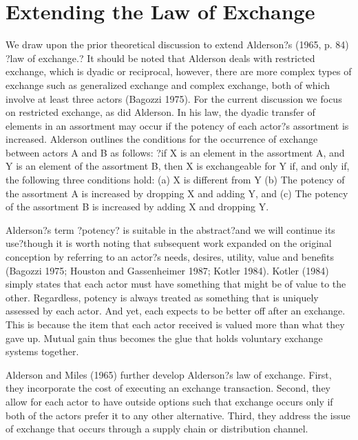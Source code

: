 \section{Extending the Law of Exchange}
We draw upon the prior theoretical discussion to extend Alderson?s (1965, p. 84) ?law of exchange.? It should be noted that Alderson deals with restricted exchange, which is dyadic or reciprocal, however, there are more complex types of exchange such as generalized exchange and complex exchange, both of which involve at least three actors (Bagozzi 1975). For the current discussion we focus on restricted exchange, as did Alderson.  In his law, the dyadic transfer of elements in an assortment may occur if the potency of each actor?s assortment is increased. Alderson outlines the conditions for the occurrence of exchange between actors A and B as follows:
?if X is an element in the assortment A, and Y is an element of the assortment B, then X is exchangeable for Y if, and only if, the following three conditions hold:
(a)	X is different from Y
(b)	The potency of the assortment A is increased by dropping X and adding Y, and
(c)	The potency of the assortment B is increased by adding X and dropping Y.

Alderson?s term ?potency? is suitable in the abstract?and we will continue its use?though it is worth noting that subsequent work expanded on the original conception by referring to an actor?s needs, desires, utility, value and benefits (Bagozzi 1975; Houston and Gassenheimer 1987; Kotler 1984). Kotler (1984) simply states that each actor must have something that might be of value to the other. Regardless, potency is always treated as something that is uniquely assessed by each actor. And yet, each expects to be better off after an exchange. This is because the item that each actor received is valued more than what they gave up. Mutual gain thus becomes the glue that holds voluntary exchange systems together. 

Alderson and Miles (1965) further develop Alderson?s law of exchange. First, they incorporate the cost of executing an exchange transaction. Second, they allow for each actor to have outside options such that exchange occurs only if both of the actors prefer it to any other alternative. Third, they address the issue of exchange that occurs through a supply chain or distribution channel. 

